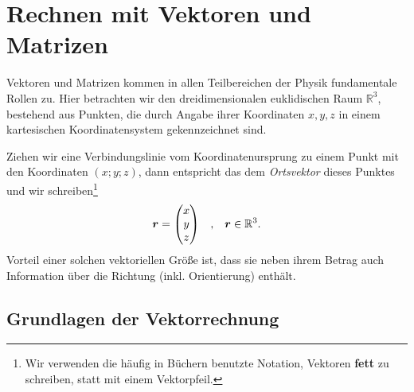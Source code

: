 \thispagestyle{plain}
\section{Rechnen mit Vektoren und Matrizen}

Vektoren und Matrizen kommen in allen Teilbereichen der Physik fundamentale Rollen zu. Hier betrachten wir den dreidimensionalen euklidischen Raum $\mathbb{R}^3$, bestehend aus Punkten, die durch Angabe ihrer Koordinaten $x,y,z$ in einem kartesischen Koordinatensystem gekennzeichnet sind. 

\begin{wrapfigure}{r}{5cm}
    \centering
    \vspace{-5mm}
    \vspace{-5mm}
\end{wrapfigure}
Ziehen wir eine Verbindungslinie vom Koordinatenursprung zu einem Punkt mit den Koordinaten $(x;y;z)$, dann entspricht das dem \emph{Ortsvektor} dieses Punktes und wir schreiben\footnote{Wir verwenden die häufig in Büchern benutzte Notation, Vektoren \textbf{fett} zu schreiben, statt mit einem Vektorpfeil.}
\begin{align}
    \bm{r} = \mqty(x\\y\\z) \qq{,} \bm{r} \in \mathbb{R}^3.
\end{align}
Vorteil einer solchen vektoriellen Größe ist, dass sie neben ihrem Betrag auch Information über die Richtung (inkl. Orientierung) enthält.

\subsection{Grundlagen der Vektorrechnung}


